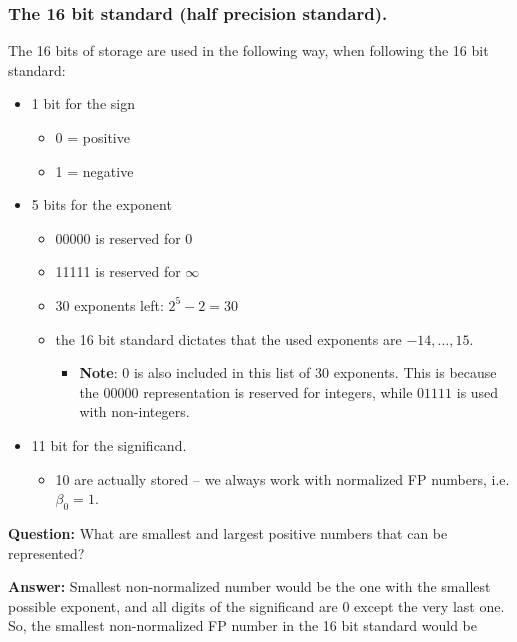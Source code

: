 \documentclass[]{book}
\providecommand{\tightlist}{%
  \setlength{\itemsep}{0pt}\setlength{\parskip}{0pt}}
\theoremstyle{definition}
\theoremstyle{definition}
\theoremstyle{definition}
\theoremstyle{remark}
\begin{document}
\subsubsection{The 16 bit standard (half precision
standard).}\label{the-16-bit-standard-half-precision-standard.}

The 16 bits of storage are used in the following way, when following the
16 bit standard:

\begin{itemize}
\tightlist
\item
  1 bit for the sign

  \begin{itemize}
  \tightlist
  \item
    0 = positive
  \item
    1 = negative
  \end{itemize}
\item
  5 bits for the exponent

  \begin{itemize}
  \tightlist
  \item
    00000 is reserved for 0
  \item
    11111 is reserved for \(\infty\)
  \item
    30 exponents left: \(2^5 - 2 = 30\)
  \item
    the 16 bit standard dictates that the used exponents are
    \(-14,...,15\).

    \begin{itemize}
    \tightlist
    \item
      \textbf{Note}: \(0\) is also included in this list of 30
      exponents. This is because the \(00000\) representation is
      reserved for integers, while \(01111\) is used with non-integers.
    \end{itemize}
  \end{itemize}
\item
  11 bit for the significand.

  \begin{itemize}
  \tightlist
  \item
    10 are actually stored -- we always work with normalized FP numbers,
    i.e. \(\beta_0 = 1\).
  \end{itemize}
\end{itemize}

\textbf{Question:} What are smallest and largest positive numbers that
can be represented?

\textbf{Answer:} Smallest non-normalized number would be the one with
the smallest possible exponent, and all digits of the significand are 0
except the very last one. So, the smallest non-normalized FP number in
the 16 bit standard would be
\end{document}
